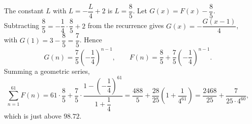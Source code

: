 The constant $L$ with $L=-\dfrac {L}{4}+2$ is $L=\dfrac{8}{5}$. Let $G(x)=F(x)-\dfrac{8}{5}$. Subtracting $\dfrac{8}{5}=-\dfrac{1}{4}\cdot\dfrac{8}{5}+2$ from the recurrence gives $G(x)=-\dfrac{G(x-1)}{4}$, with $G(1)=3-\dfrac{8}{5}=\dfrac{7}{5}$. Hence
\[
G(n)=\dfrac{7}{5}\left(-\dfrac{1}{4}\right)^{n-1},\qquad F(n)=\dfrac{8}{5}+\dfrac{7}{5}\left(-\dfrac{1}{4}\right)^{n-1}.
\]
Summing a geometric series,
\[
\sum_{n=1}^{61}F(n)=61\cdot\dfrac{8}{5}+\dfrac{7}{5}\cdot\dfrac{1-\left(-\dfrac{1}{4}\right)^{61}}{1+\dfrac{1}{4}}=\dfrac{488}{5}+\dfrac{28}{25}\left(1+\dfrac{1}{4^{61}}\right)=\boxed{\dfrac{2468}{25}+\dfrac{7}{25\cdot4^{60}}},
\]
which is just above $98.72$.
